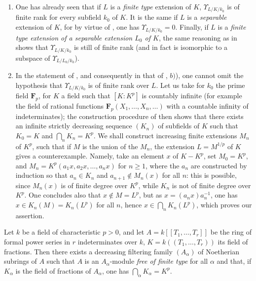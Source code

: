 \begin{remarks}[21.8.7]
\label{0.21.8.7}
\begin{enumerate}
  \item[(i)] One has already seen  that if $L$ is a \emph{finite type} extension of $K$, $\Upsilon_{L/K/k_0}$ is of finite rank for every subfield $k_0$ of $K$.
    It is the same if $L$ is a \emph{separable} extension of $K$, for by virtue of , one has $\Upsilon_{L/K/k_0}=0$.
    Finally, if $L$ is a \emph{finite type extension of a separable extension $L_0$ of $K$}, the same reasoning as in  shows that $\Upsilon_{L/K/k_0}$ is still of finite rank (and in fact is isomorphic to a subspace of $\Upsilon_{L/L_0/k_0}$).
  \item[(ii)] In the statement of , and consequently in that of , $b)$), one cannot omit the hypothesis that $\Upsilon_{L/K/k_0}$ is of finite rank over $L$.
    Let us take for $k_0$ the prime field $\mathbf{F}_p$, for $K$ a field such that $[K:K^p]$ is countably infinite (for example the field of rational functions $\mathbf{F}_p(X_1,\ldots,X_n,\ldots)$ with a countable infinity of indeterminates);
    the construction procedure of  then shows that there exists an infinite strictly decreasing sequence $(K_n)$ of subfields of $K$ such that $K_0=K$ and $\bigcap_n K_n=K^p$.
    We shall construct increasing finite extensions $M_n$ of $K^p$, such that if $M$ is the union of the $M_n$, the extension $L=M^{1/p}$ of $K$ gives  a counterexample.
    Namely, take an element $x$ of $K-K^p$, set $M_0=K^p$, and $M_n=K^p(a_1 x,a_2 x,\ldots,a_n x)$ for $n\geqslant 1$, where the $a_n$ are constructed by induction so that $a_n\in K_n$ and $a_{n+1}\notin M_n(x)$ for all $n$: this is possible, since $M_n(x)$ is of finite degree over $K^p$, while $K_n$ is not of finite degree over $K^p$.
    One concludes also that $x\notin M=L^p$, but as $x=(a_n x)a_n^{-1}$, one has $x\in K_n(M)=K_n(L^p)$ for all $n$, hence $x\in\bigcap_n K_n(L^p)$, which proves our assertion.
\end{enumerate}
\end{remarks}

\begin{proposition}[21.8.8]
\label{0.21.8.8}
Let $k$ be a field of characteristic $p>0$, and let $A=k[[T_1,\ldots,T_r]]$ be the ring of formal power series in $r$ indeterminates over $k$, $K=k((T_1,\ldots,T_r))$ its field of fractions.
Then there exists a decreasing filtering family $(A_\alpha)$ of Noetherian subrings of $A$ such that $A$ is an $A_\alpha$-module \emph{free of finite type} for all $\alpha$ and that, if $K_\alpha$ is the field of fractions of $A_\alpha$, one has $\bigcap_\alpha K_\alpha=K^p$.
\end{proposition}

